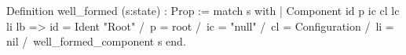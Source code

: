 Definition well_formed (s:state) : Prop :=
  match s with
    | Component id p ic cl lc li lb => 
      id = Ident "Root" /\ p = root /\ ic = "null" /\
      cl = Configuration /\ li = nil /\
      well_formed_component s
  end.